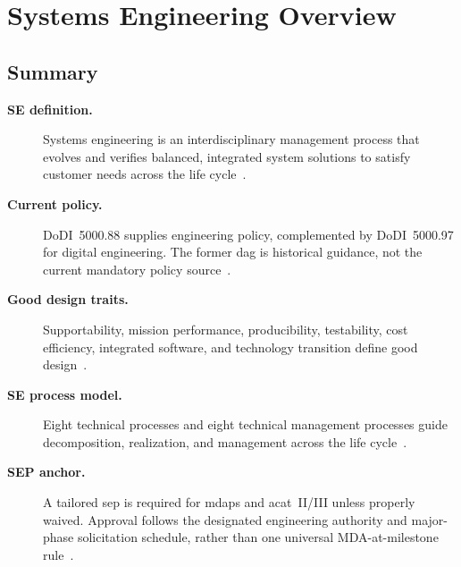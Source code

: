 \documentclass[../main.tex]{subfiles}
\begin{document}
\section{Systems Engineering Overview}

\subsection{Summary}
\begin{description}
  \item[\textbf{SE definition.}] Systems engineering is an interdisciplinary management process that evolves and verifies balanced, integrated system solutions to satisfy customer needs across the life cycle~\autocite{edo-3-5-1-systems-engineering-overview-2025}.
  \item[\textbf{Current policy.}] DoDI~5000.88 supplies engineering policy, complemented by DoDI~5000.97 for digital engineering. The former \ac{dag} is historical guidance, not the current mandatory policy source~\autocite{DoDI5000-88,DoDI5000-97}.
  \item[\textbf{Good design traits.}] Supportability, mission performance, producibility, testability, cost efficiency, integrated software, and technology transition define good design~\autocite{edo-3-5-1-systems-engineering-overview-2025}.
  \item[\textbf{SE process model.}] Eight technical processes and eight technical management processes guide decomposition, realization, and management across the life cycle~\autocite{edo-3-5-1-systems-engineering-overview-2025}.
  \item[\textbf{SEP anchor.}] A tailored \ac{sep} is required for \acp{mdap} and \ac{acat}~II/III unless properly waived. Approval follows the designated engineering authority and major-phase solicitation schedule, rather than one universal MDA-at-milestone rule~\autocite{DoDI5000-88}.
\end{description}
\end{document}
